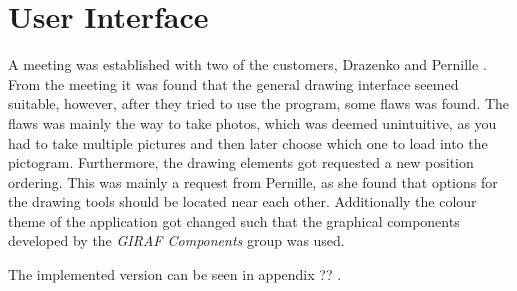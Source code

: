 \section{User Interface}
A meeting was established with two of the customers, Drazenko and Pernille \citep{misc:drazenko, misc:pernille}.
From the meeting it was found that the general drawing interface seemed suitable, however, after they tried to use the program, some flaws was found.
The flaws was mainly the way to take photos, which was deemed unintuitive, as you had to take multiple pictures and then later choose which one to load into the pictogram.
Furthermore, the drawing elements got requested a new position ordering.
This was mainly a request from Pernille, as she found that options for the drawing tools should be located near each other.
Additionally the colour theme of the application got changed such that the graphical components developed by the \textit{GIRAF Components} group was used.

The implemented version can be seen in appendix ?? .


